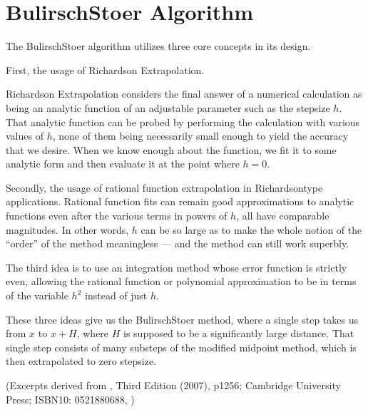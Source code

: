 \documentclass[letterpaper,10pt,english]{sphinxmanual}
\begin{document}
\ignorespaces 

\section{Bulirsch\sphinxhyphen{}Stoer Algorithm}
\label{\detokenize{bulirschStoer:bulirsch-stoer-algorithm}}\label{\detokenize{bulirschStoer:bsdetail}}\label{\detokenize{bulirschStoer:index-1}}
\sphinxAtStartPar
The Bulirsch\sphinxhyphen{}Stoer algorithm utilizes three core concepts in its design.

\sphinxAtStartPar
First, the usage of Richardson Extrapolation.


\sphinxAtStartPar
Richardson Extrapolation considers the final answer of a numerical calculation as being an analytic function of an adjustable parameter such as the stepsize \(h\). That analytic function can be probed by performing the calculation with various values of \(h\), none of them being necessarily small enough to yield the accuracy that we desire. When we know enough about the function, we fit it to some analytic form and then evaluate it at the point where \(h = 0\).

\sphinxAtStartPar
Secondly, the usage of rational function extrapolation in Richardson\sphinxhyphen{}type applications. Rational function fits can remain good approximations to analytic functions even after the various terms in powers of \(h\), all have comparable magnitudes. In other words, \(h\) can be so large as to make the whole notion of the “order” of the method meaningless — and the method can still work superbly.

\sphinxAtStartPar
The third idea is to use an integration method whose error function is strictly even, allowing the rational function or polynomial approximation to be in terms of the variable \(h^2\) instead of just \(h\).

\sphinxAtStartPar
These three ideas give us the Bulirsch\sphinxhyphen{}Stoer method, where a single step takes us from \(x\) to \(x + H\), where \(H\) is supposed to be a significantly large distance. That single step consists of many substeps of the modified midpoint method, which is then extrapolated to zero stepsize.

\sphinxAtStartPar
(Excerpts derived from , Third Edition (2007), p1256; Cambridge University Press; ISBN\sphinxhyphen{}10: 0521880688, )
\end{document}
